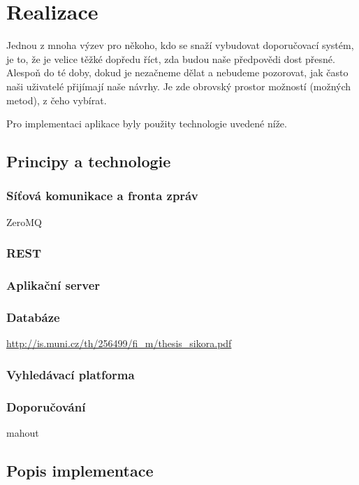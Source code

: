 \documentclass[thesis=M,czech]{FITthesis}[2014/05/07]
\begin{document}
\chapter{Realizace}
\label{chap:impl}

Jednou z mnoha výzev pro někoho, kdo se snaží vybudovat doporučovací systém, je to, že je velice těžké dopředu říct, zda budou naše předpovědi dost přesné. Alespoň do té doby, dokud je nezačneme dělat a nebudeme pozorovat, jak často naši uživatelé přijímají naše návrhy. Je zde obrovský prostor možností (možných metod), z čeho vybírat. 

Pro implementaci aplikace byly použity technologie uvedené níže.

\section{Principy a technologie}
\label{sec:sysanalys}

\subsection{Síťová komunikace a fronta zpráv}
ZeroMQ

\subsection{REST}

\subsection{Aplikační server}

\subsection{Databáze}

\url{http://is.muni.cz/th/256499/fi_m/thesis_sikora.pdf}

\subsection{Vyhledávací platforma}

\subsection{Doporučování}
mahout

\section{Popis implementace}
\label{sec:impl}
\end{document}
